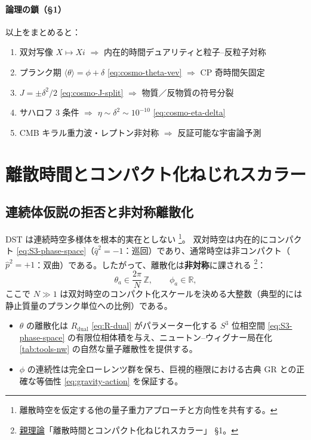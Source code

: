 \documentclass[dvipdfmx,a4paper,oneside]{jsbook}
\numberwithin{equation}{chapter}
\begin{document}
\paragraph{論理の鎖（§1）}
以上をまとめると：
\begin{enumerate}[leftmargin=2em]
  \item 双対写像 \(X \mapsto Xi\) \(\Rightarrow\) 内在的時間デュアリティと粒子--反粒子対称
  \item プランク期 \(\langle\theta\rangle = \phi + \delta\) \eqref{eq:cosmo-theta-vev} \(\Rightarrow\) CP 奇時間矢固定
  \item \(J = \pm\delta^2/2\) \eqref{eq:cosmo-J-split} \(\Rightarrow\) 物質／反物質の符号分裂
  \item サハロフ 3 条件 \(\Rightarrow\) \(\eta \sim \delta^2 \sim 10^{-10}\) \eqref{eq:cosmo-eta-delta}
  \item CMB キラル重力波・レプトン非対称 \(\Rightarrow\) 反証可能な宇宙論予測
\end{enumerate}

\section{離散時間とコンパクト化ねじれスカラー}

\subsection{連続体仮説の拒否と非対称離散化}

DST は連続時空多様体を根本的実在としない \footnote{離散時空を仮定する他の量子重力アプローチと方向性を共有する。}。
双対時空は内在的にコンパクト \eqref{eq:S3-phase-space}（\(\hat{q}^2 = -1\)：巡回）であり、通常時空は非コンパクト（\(\hat{p}^2 = +1\)：双曲）である。したがって、離散化は\textbf{非対称}に課される \footnote{\hyperref[sec:sister-manuscripts]{親理論}「離散時間とコンパクト化ねじれスカラー」 §1。}：
\begin{equation}
  \theta_a \in \frac{2\pi}{N}\,\mathbb{Z},
  \qquad
  \phi_a \in \mathbb{R},
  \label{eq:cosmo-discrete-theta}
\end{equation}
ここで \(N \gg 1\) は双対時空のコンパクト化スケールを決める大整数（典型的には静止質量のプランク単位への比例）である。

\begin{itemize}[leftmargin=2em]
  \item \(\theta\) の離散化は \(R_{\mathrm{dual}}\) \eqref{eq:R-dual} がパラメーター化する \(S^3\) 位相空間 \eqref{eq:S3-phase-space} の有限位相体積を与え、ニュートン--ウィグナー局在化 \eqref{tab:tools-nw} の自然な量子離散性を提供する。
  \item \(\phi\) の連続性は完全ローレンツ群を保ち、巨視的極限における古典 GR との正確な等価性 \eqref{eq:gravity-action} を保証する。
\end{itemize}
\end{document}

